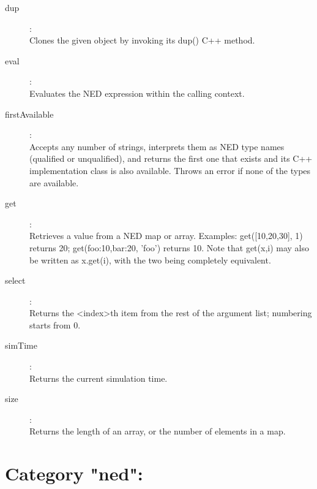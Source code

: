 \begin{description}
\item[dup]:  \\
    Clones the given object by invoking its dup() C++ method.

\item[eval]:  \\
    Evaluates the NED expression within the calling context.

\item[firstAvailable]:  \\
    Accepts any number of strings, interprets them as NED type names (qualified
    or unqualified), and returns the first one that exists and its C++
    implementation class is also available. Throws an error if none of the
    types are available.

\item[get]:  \\
    Retrieves a value from a NED map or array. Examples: get([10,20,30], 1)
    returns 20; get({foo:10,bar:20}, 'foo') returns 10. Note that get(x,i) may
    also be written as x.get(i), with the two being completely equivalent.

\item[select]:  \\
    Returns the <index>th item from the rest of the argument list; numbering
    starts from 0.

\item[simTime]:  \\
    Returns the current simulation time.

\item[size]:  \\
    Returns the length of an array, or the number of elements in a map.


\end{description}

\section{Category "ned":}
\label{sec:ned-functions:category-ned}

